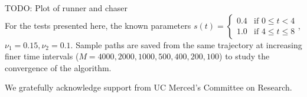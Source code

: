 \documentclass[graybox]{svmult}
\begin{document}
TODO: Plot of runner and chaser \\

For the tests presented here, the known parameters $s(t) =
\left\{
	\begin{array}{ll}
		0.4  & \mbox{if } 0 \leq t < 4 \\
		1.0 & \mbox{if } 4 \leq t \leq 8
	\end{array}
\right.$, $\nu_1 = 0.15, \nu_2 = 0.1$. Sample paths are saved from the same trajectory at increasing finer time intervals ($M = 4000,2000,1000,500,400,200,100$) to study the convergence of the algorithm. 

\begin{acknowledgement}
We gratefully acknowledge support from UC Merced's Committee on Research.
\end{acknowledgement}



\end{document}
